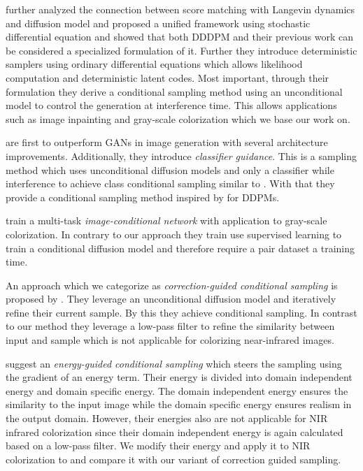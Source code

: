 \textcite{sbgm} further analyzed the connection between score matching with Langevin dynamics and diffusion model and proposed a unified framework using stochastic differential equation
and showed that both DDDPM \parencite{ddpm} and their previous work \parencite{generative-modeling-by-estimating-gradients-of-the-data-distribution} can be considered a specialized formulation of it.
Further they introduce deterministic samplers using ordinary differential equations which allows likelihood computation and deterministic latent codes. 
Most important, through their formulation they derive a conditional sampling method using an unconditional model to control the generation at interference time. 
This allows applications such as image inpainting and gray-scale colorization which we base our work on. 

\textcite{diffusion-beats-gans} are first to outperform GANs in image generation with several architecture improvements.
Additionally, they introduce \textit{classifier guidance}.
This is a sampling method which uses unconditional diffusion models and only a classifier while interference to achieve class conditional sampling similar to \textcite{sbgm}.
With that they provide a conditional sampling method inspired by \textcite{sbgm} for DDPMs. 

\textcite{palette} train a multi-task \textit{image-conditional network} with application to gray-scale colorization. 
In contrary to our approach they train use supervised learning to train a conditional diffusion model and therefore require a pair dataset a training time.

An approach which we categorize as \textit{correction-guided conditional sampling} is proposed by \textcite{ilvr}.
They leverage an unconditional diffusion model and iteratively refine their current sample. 
By this they achieve conditional sampling. 
In contrast to our method they leverage a low-pass filter to refine the similarity between input and sample which is not applicable for colorizing near-infrared images. 

\textcite{egsde} suggest an \textit{energy-guided conditional sampling} which steers the sampling using the gradient of an energy term.
Their energy is divided into domain independent energy and domain specific energy. 
The domain independent energy ensures the similarity to the input image while the domain specific energy ensures realism in the output domain. 
However, their energies also are not applicable for NIR infrared colorization since their domain independent energy is again calculated based on a low-pass filter. 
We modify their energy and apply it to NIR colorization to and compare it with our variant of correction guided sampling.

